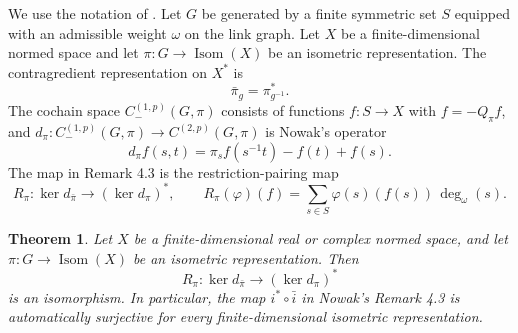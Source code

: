 \documentclass[11pt]{article}
\newtheorem{theorem}{Theorem}
\newcommand{\Isom}{\operatorname{Isom}}
\begin{document}
We use the notation of \cite{Nowak2011}. Let \(G\) be generated by a finite
symmetric set \(S\) equipped with an admissible weight \(\omega\) on the link
graph. Let \(X\) be a finite-dimensional normed space and let
\(\pi:G\to \Isom(X)\) be an isometric representation. The contragredient
representation on \(X^*\) is
\[
   \bar\pi_g=\pi_{g^{-1}}^* .
\]
The cochain space \(C_-^{(1,p)}(G,\pi)\) consists of functions \(f:S\to X\)
with \(f=-Q_\pi f\), and \(d_\pi:C_-^{(1,p)}(G,\pi)\to C^{(2,p)}(G,\pi)\) is
Nowak's operator
\[
   d_\pi f(s,t)=\pi_s f(s^{-1}t)-f(t)+f(s).
\]
The map in Remark 4.3 is the restriction-pairing map
\[
 R_\pi:\ker d_{\bar\pi}\longrightarrow (\ker d_\pi)^*,\qquad
 R_\pi(\varphi)(f)=\sum_{s\in S}\varphi(s)(f(s))\,\deg_\omega(s).
\]

\begin{theorem}
Let \(X\) be a finite-dimensional real or complex normed space, and let
\(\pi:G\to\Isom(X)\) be an isometric representation. Then
\[
   R_\pi:\ker d_{\bar\pi}\longrightarrow(\ker d_\pi)^*
\]
is an isomorphism. In particular, the map \(i^*\circ\bar i\) in Nowak's
Remark 4.3 is automatically surjective for every finite-dimensional isometric
representation.
\end{theorem}
\end{document}
